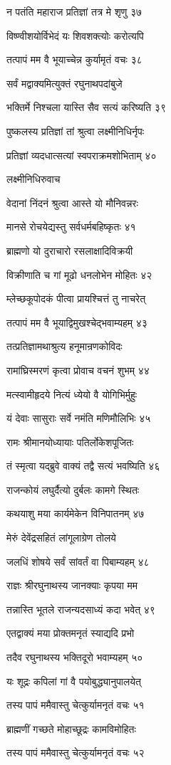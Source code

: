 न पतंति महाराज प्रतिज्ञां तत्र मे शृणु ३७

विष्ण्वीशयोर्विभेदं यः शिवशक्त्योः करोत्यपि

तत्पापं मम वै भूयाच्चेन्न कुर्यामृतं वचः ३८

सर्वं मद्वाक्यमित्युक्तं रघुनाथपदांबुजे

भक्तिर्मे निश्चला यास्ति सैव सत्यं करिष्यति ३९

पुष्कलस्य प्रतिज्ञां तां श्रुत्वा लक्ष्मीनिधिर्नृपः

प्रतिज्ञां व्यदधात्सत्यां स्वपराक्रमशोभिताम् ४०

लक्ष्मीनिधिरुवाच

वेदानां निंदनं श्रुत्वा आस्ते यो मौनिवन्नरः

मानसे रोचयेद्यस्तु सर्वधर्मबहिष्कृतः ४१

ब्राह्मणो यो दुराचारो रसलाक्षादिविक्रयी

विक्रीणाति च गां मूढो धनलोभेन मोहितः ४२

म्लेच्छकूपोदकं पीत्वा प्रायश्चित्तं तु नाचरेत्

तत्पापं मम वै भूयाद्विमुखश्चेद्भवाम्यहम् ४३

तत्प्रतिज्ञामथाश्रुत्य हनूमान्रणकोविदः

रामांघ्रिस्मरणं कृत्वा प्रोवाच वचनं शुभम् ४४

मत्स्वामीहृदये नित्यं ध्येयो वै योगिभिर्मुहुः

यं देवाः सासुराः सर्वे नमंति मणिमौलिभिः ४५

रामः श्रीमानयोध्यायाः पतिर्लोकेशपूजितः

तं स्मृत्वा यद्ब्रुवे वाक्यं तद्वै सत्यं भवष्यिति ४६

राजन्कोयं लघुर्दैत्यो दुर्बलः कामगे स्थितः

कथयाशु मया कार्यमेकेन विनिपातनम् ४७

मेरुं देवेंद्रसहितं लांगूलाग्रेण तोलये

जलधिं शोषये सर्वं सांवर्तं वा पिबाम्यहम् ४८

राज्ञः श्रीरघुनाथस्य जानक्याः कृपया मम

तन्नास्ति भूतले राजन्यदसाध्यं कदा भवेत् ४९

एतद्वाक्यं मया प्रोक्तमनृतं स्याद्यदि प्रभो

तदैव रघुनाथस्य भक्तिदूरो भवाम्यहम् ५०

यः शूद्रः कपिलां गां वै पयोबुद्ध्यानुपालयेत्

तस्य पापं ममैवास्तु चेत्कुर्यामनृतं वचः ५१

ब्राह्मणीं गच्छते मोहाच्छूद्रः कामविमोहितः

तस्य पापं ममैवास्तु चेत्कुर्यामनृतं वचः ५२

